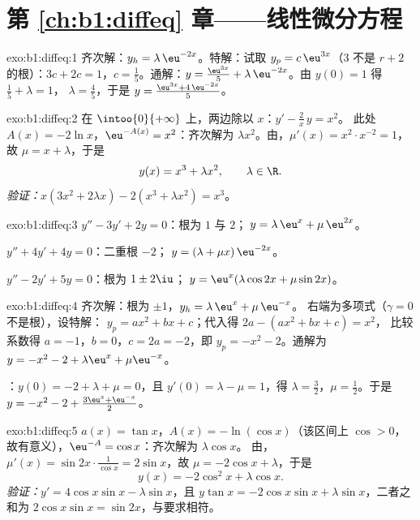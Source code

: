 \section*{第 \ref{ch:b1:diffeq} 章——线性微分方程}

\begin{solution}{exo:b1:diffeq:1}
齐次解：$y_h = \lambda\,\eu^{-2x}$。特解：试取 $y_p =
c\,\eu^{3x}$（$3$ 不是 $r + 2$ 的根）：$3c + 2c = 1$，$c =
\frac15$。通解：$y = \frac{\eu^{3x}}{5} +
\lambda\,\eu^{-2x}$。由 $y(0) = 1$ 得 $\frac15 + \lambda = 1$，
$\lambda = \frac45$，于是 $y = \frac{\eu^{3x} + 4\,\eu^{-2x}}{5}$。
\end{solution}

\begin{solution}{exo:b1:diffeq:2}
在 $\intoo{0}{+\infty}$ 上，两边除以 $x$：$y' - \frac{2}{x}\,y = x^2$。
此处 $A(x) = -2\ln x$，$\eu^{-A(x)} = x^2$：齐次解为
$\lambda x^2$。由，$\mu'(x) = x^2 \cdot x^{-2} =
1$，故 $\mu = x + \lambda$，于是
\[
y(x) = x^3 + \lambda x^2, \qquad \lambda \in \R .
\]
\emph{验证：}$x(3x^2 + 2\lambda x) - 2(x^3 + \lambda x^2) = x^3$。
\end{solution}

\begin{solution}{exo:b1:diffeq:3}
$y'' - 3y' + 2y = 0$：根为 $1$ 与 $2$；$\;y = \lambda\,\eu^{x} +
\mu\,\eu^{2x}$。

$y'' + 4y' + 4y = 0$：二重根 $-2$；$\;y = (\lambda + \mu
x)\,\eu^{-2x}$。

$y'' - 2y' + 5y = 0$：根为 $1 \pm 2\iu$；$\;y = \eu^{x}(\lambda\cos
2x + \mu\sin 2x)$。
\end{solution}

\begin{solution}{exo:b1:diffeq:4}
齐次解：根为 $\pm 1$，$y_h = \lambda\,\eu^x + \mu\,\eu^{-x}$。
右端为多项式（$\gamma = 0$ 不是根），设特解：
$y_p = ax^2 + bx + c$；代入得 $2a - (ax^2 + bx + c) = x^2$，
比较系数得 $a = -1$，$b = 0$，$c = 2a = -2$，即 $y_p = -x^2 - 2$。通解为
$y = -x^2 - 2 + \lambda\eu^x + \mu\eu^{-x}$。

：$y(0) = -2 + \lambda + \mu = 0$，且 $y'(0) = \lambda - \mu =
1$，得 $\lambda = \frac32$，$\mu = \frac12$。于是
$y = -x^2 - 2 + \frac{3\eu^x + \eu^{-x}}{2}$。
\end{solution}

\begin{solution}{exo:b1:diffeq:5}
$a(x) = \tan x$，$A(x) = -\ln(\cos x)$（该区间上 $\cos > 0$，
故有意义），$\eu^{-A} = \cos x$：齐次解为 $\lambda\cos x$。
由，$\mu'(x) = \sin 2x \cdot \frac{1}{\cos x} =
2\sin x$，故 $\mu = -2\cos x + \lambda$，于是
\[
y(x) = -2\cos^2 x + \lambda \cos x .
\]
\emph{验证：}$y' = 4\cos x \sin x - \lambda\sin x$，且 $y\tan x =
-2\cos x\sin x + \lambda \sin x$，二者之和为 $2\cos x\sin x =
\sin 2x$，与要求相符。
\end{solution}

